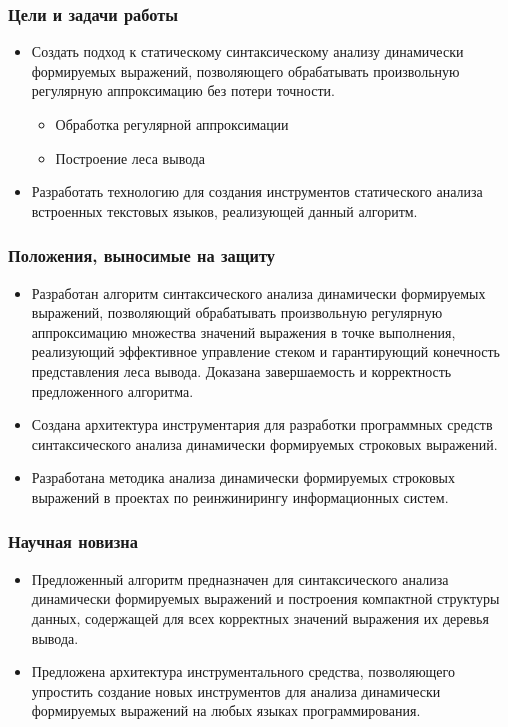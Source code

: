 \documentclass{beamer}
\begin{document}
\begin{frame}
    \transwipe[direction=90]
    \frametitle{Цели и задачи работы}
    \begin{itemize}
        \item Создать подход к статическому синтаксическому анализу динамически формируемых выражений, позволяющего обрабатывать произвольную регулярную аппроксимацию без потери точности.
        \begin{itemize}
            \item Обработка регулярной аппроксимации
            \item Построение леса вывода
        \end{itemize}
        \item Разработать технологию для создания инструментов статического анализа встроенных текстовых языков, реализующей данный алгоритм.
    \end{itemize}
\end{frame}

\begin{frame}
    \transwipe[direction=90]
    \frametitle{Положения, выносимые на защиту}
        \begin{itemize}
            \item Разработан алгоритм синтаксического анализа динамически формируемых выражений, позволяющий обрабатывать произвольную регулярную аппроксимацию множества значений выражения в точке выполнения, реализующий эффективное управление стеком и гарантирующий конечность представления леса вывода. Доказана завершаемость и корректность предложенного алгоритма.
            \item Создана архитектура инструментария для разработки программных средств синтаксического анализа динамически формируемых строковых выражений.
            \item Разработана методика анализа динамически формируемых строковых выражений в проектах по реинжинирингу информационных систем.  
        \end{itemize}
\end{frame}

\begin{frame}
    \transwipe[direction=90]
    \frametitle{Научная новизна}
    \begin{itemize}
        \item Предложенный алгоритм предназначен для синтаксического анализа динамически формируемых выражений и построения компактной структуры данных, содержащей для всех корректных значений выражения их деревья вывода.
        \item Предложена архитектура инструментального средства, позволяющего упростить создание новых инструментов для анализа динамически формируемых выражений на любых языках программирования.
    \end{itemize}
\end{frame}
\end{document}
